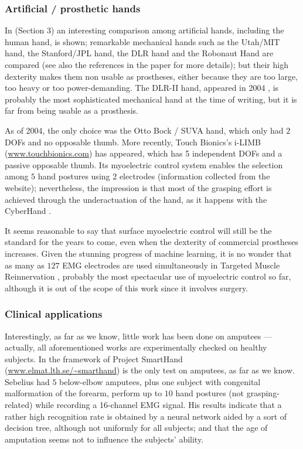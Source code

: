 \subsubsection{Artificial / prosthetic hands}

In \cite{zecca02} (Section 3) an interesting comparison among artificial hands, including
the human hand, is shown; remarkable mechanical hands such as the Utah/MIT hand, the
Stanford/JPL hand, the DLR hand and the Robonaut Hand are compared (see also the
references in the paper for more details); but their high dexterity makes them non
usable as prostheses, either because they are too large, too heavy or too power-demanding.
The DLR-II hand, appeared in 2004 \cite{ButFisGre2004}, is probably the most sophisticated
mechanical hand at the time of writing, but it is far from being usable as a prosthesis.

As of 2004, the only choice was the Otto Bock / SUVA hand, which only had $2$ DOFs and
no opposable thumb. More recently, Touch Bionics's i-LIMB (\url{www.touchbionics.com}) has appeared, which has
5 independent DOFs and a passive opposable thumb. Its myoelectric control system enables
the selection among $5$ hand postures using $2$ electrodes (information collected from the
website); nevertheless, the impression is that most of the grasping effort is achieved through
the underactuation of the hand, as it happens with the CyberHand \cite{cyberhand}.

It seems reasonable to say that surface myoelectric control will still be the standard for the
years to come, even when the dexterity of commercial prostheses increases. Given the
stunning progress of machine learning, it is no wonder that as many as $127$ EMG
electrodes are used simultaneously in Targeted
Muscle Reinnervation \cite{kuiken06}, probably the most spectacular use of myoelectric control
so far, although it is out of the scope of this work since it involves surgery.

\subsubsection{Clinical applications}

Interestingly, as far as we know, little work has been done on amputees --- actually,
all aforementioned works are experimentally checked on healthy subjects. In the framework of
Project SmartHand (\url{www.elmat.lth.se/~smarthand}) \cite{sebelius} is the only
test on amputees, as far as we know. Sebelius had $5$ below-elbow amputees, plus one subject
with congenital malformation of the forearm, perform up to
$10$ hand postures (not grasping-related) while recording a 16-channel EMG signal. His
results indicate that a rather high recognition rate is obtained by a neural network
aided by a sort of decision tree, although not uniformly for all subjects; and that
the age of amputation seems not to influence the subjects' ability.
